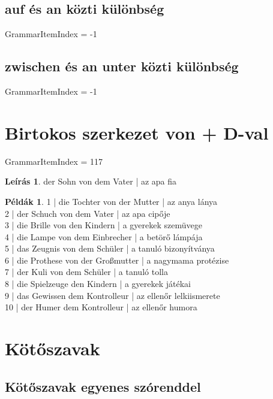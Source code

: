 \documentclass{article}
\theoremstyle{definition}
\newtheorem*{exmp}{Példák}
\newtheorem*{desc}{Leírás}
\begin{document}
\subsection{auf és an közti különbség}

GrammarItemIndex = -1

\subsection{zwischen és an unter közti különbség}

GrammarItemIndex = -1

\section{Birtokos szerkezet von + D-val}

GrammarItemIndex = 117

\begin{desc}
der Sohn von dem Vater | az apa fia
\end{desc}

\begin{exmp}	%
1 | die Tochter von der Mutter | az anya lánya\\
2 | der Schuch von dem Vater | az apa cipője\\
3 | die Brille von den Kindern | a gyerekek szemüvege\\
4 | die Lampe von dem Einbrecher | a betörő lámpája\\
5 | das Zeugnis von dem Schüler | a tanuló bizonyítványa\\
6 | die Prothese von der Großmutter | a nagymama protézise\\
7 | der Kuli von dem Schüler | a tanuló tolla\\
8 | die Spielzeuge den Kindern | a gyerekek játékai\\
9 | das Gewissen dem Kontrolleur | az ellenőr lelkiismerete\\
10 | der Humer dem Kontrolleur | az ellenőr humora\\
\end{exmp}

\section{Kötőszavak}

\subsection{Kötőszavak egyenes szórenddel}
\end{document}
